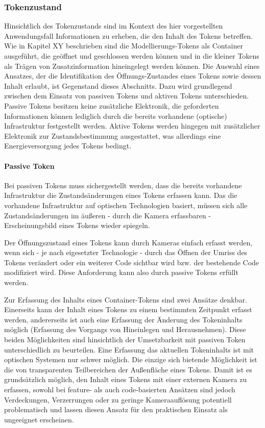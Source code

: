 

\subsubsection{Tokenzustand} %
\label{ssub:tokenzustand}

Hinsichtlich des Tokenzustands sind im Kontext des hier vorgestellten Anwendungsfall Informationen zu erheben, die den Inhalt des Tokens betreffen. Wie in Kapitel XY beschrieben sind die Modellierungs-Tokens als Container ausgeführt, die geöffnet und geschlossen werden können und in die kleiner Tokens als Trägen von Zusatzinformation hineingelegt werden können. Die Auswahl eines Ansatzes, der die Identifikation des Öffnungs-Zustandes eines Tokens sowie dessen Inhalt erlaubt, ist Gegenstand dieses Abschnitts. Dazu wird grundlegend zwischen dem Einsatz von passiven Tokens und aktiven Tokens unterschieden. Passive Tokens besitzen keine zusätzliche Elektronik, die geforderten Informationen können lediglich durch die bereits vorhandene (optische) Infrastruktur festgestellt werden. Aktive Tokens werden hingegen mit zusätzlicher Elektronik zur Zustandsbestimmung ausgestattet, was allerdings eine Energieversorgung jedes Tokens bedingt.

\paragraph{Passive Token} %
\label{par:passive_token}
 
Bei passiven Tokens muss sichergestellt werden, dass die bereits vorhandene Infrastruktur die Zustandsänderungen eines Tokens erfassen kann. Das die vorhandene Infrastruktur auf optischen Technologien basiert, müssen sich alle Zustandsänderungen im äußeren - durch die Kamera erfassbaren - Erscheinungsbild eines Tokens wieder spiegeln.

Der Öffnungszustand eines Tokens kann durch Kameras einfach erfasst werden, wenn sich - je nach eigesetzter Technologie - durch das Öffnen der Umriss des Tokens verändert oder ein weiterer Code sichtbar wird bzw. der bestehende Code modifiziert wird. Diese Anforderung kann also durch passive Tokens erfüllt werden.

Zur Erfassung des Inhalts eines Container-Tokens sind zwei Ansätze denkbar. Einerseits kann der Inhalt eines Tokens zu einem bestimmten Zeitpunkt erfasst werden, andererseits ist auch eine Erfassung der Änderung des Tokeninhalts möglich (Erfassung des Vorgangs von Hineinlegen und Herausnehmen). Diese beiden Möglichkeiten sind hinsichtlich der Umsetzbarkeit mit passiven Token unterschiedlich zu beurteilen. Eine Erfassung das aktuellen Tokeninhalts ist mit optischen Systemen nur schwer möglich. Die einzige sich bietende Möglichkeit ist die von transparenten Teilbereichen der Außenfläche eines Tokens. Damit ist es grundsätzlich möglich, den Inhalt eines Tokens mit einer externen Kamera zu erfassen, sowohl bei feature- als auch code-basierten Ansätzen sind jedoch Verdeckungen, Verzerrungen oder zu geringe Kameraauflösung potentiell problematisch und lassen diesen Ansatz für den praktischen Einsatz als ungeeignet erscheinen.

